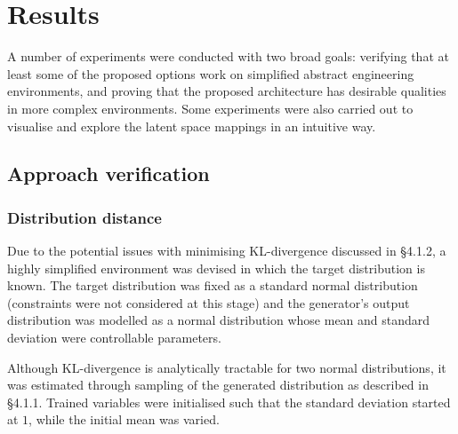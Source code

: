 \documentclass[../../main.tex]{subfiles}
\begin{document}
\chapter{Results}

A number of experiments were conducted with two broad goals: verifying that at least some of the proposed options work on simplified abstract engineering environments, and proving that the proposed architecture has desirable qualities in more complex environments.
Some experiments were also carried out to visualise and explore the latent space mappings in an intuitive way.

\section{Approach verification}

\subsection{Distribution distance}

Due to the potential issues with minimising KL-divergence discussed in \S 4.1.2, a highly simplified environment was devised in which the target distribution is known.
The target distribution was fixed as a standard normal distribution (constraints were not considered at this stage) and the generator's output distribution was modelled as a normal distribution whose mean and standard deviation were controllable parameters.

Although KL-divergence is analytically tractable for two normal distributions, it was estimated through sampling of the generated distribution as described in \S 4.1.1.
Trained variables were initialised such that the standard deviation started at $1$, while the initial mean was varied.
\end{document}
